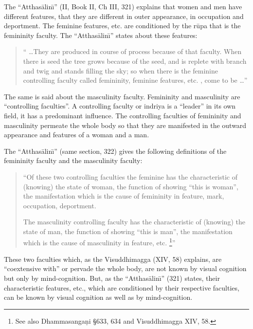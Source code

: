 \documentclass{book}
\begin{document}
The ``Atthas{\=a}lin\=\i'' (II, Book II, Ch III, 321) explains that women
and men have different features, that they are different in outer
appearance, in occupation and deportment. The feminine features, etc.
are conditioned by the r\=upa that is the femininity faculty. The
``Atthas{\=a}lin\=\i'' states about these features:




\begin{quote}\begin{flushleft}
`` \ldots They are produced in course of process because of that faculty.
When there is seed the tree grows because of the seed, and is replete
with branch and twig and stands filling the sky; so when there is the
feminine controlling faculty called femininity, feminine features, etc.
, come to be \ldots''
\end{flushleft}\end{quote}




The same is said about the masculinity faculty. 
Femininity and masculinity are ``controlling faculties''. A controlling
faculty or indriya is a ``leader'' in its own field, it has a
predominant influence. The controlling faculties of femininity and
masculinity permeate the whole body so that they are manifested in the
outward appearance and features of a woman and a man.

The ``Atthas{\=a}lin\=\i'' (same section, 322) gives the following
definitions of the femininity faculty and the masculinity faculty:




\begin{quote}\begin{flushleft}
``Of these two controlling faculties the feminine has the characteristic
of (knowing) the state of woman, the function of showing ``this is
woman'', the manifestation which is the cause of femininity in feature,
mark, occupation, deportment. 

The masculinity controlling faculty has the characteristic of (knowing)
the state of man, the function of showing ``this is man'', the
manifestation which is the cause of masculinity in feature, etc.
\footnote{See also Dhamma\-sanga\d ni {\S}633, 634 and Visuddhimagga
XIV, 58.}'' 
\end{flushleft}\end{quote}




These two faculties which, as the Visuddhimagga (XIV, 58) explains, are
``coextensive with'' or pervade the whole body, are not known by visual
cognition but only by mind-cognition. But, as the
``Atthas{\=a}lin\=\i'' (321) states, their characteristic
features, etc., which are conditioned by their respective faculties,
can be known by visual cognition as well as by mind-cognition. 
\end{document}
